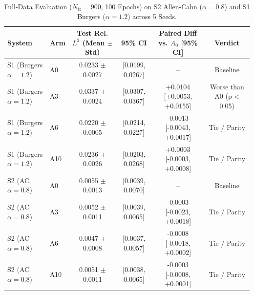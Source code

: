 \begin{table}[t]
\centering
\small
\caption{Full-Data Evaluation ($N_{\text{tr}}=900$, 100 Epochs) on S2 Allen-Cahn ($\alpha=0.8$) and S1 Burgers ($\alpha=1.2$) across 5 Seeds.}
\label{tab:p4_n900}
\begin{tabular}{llcccc}
\toprule
System & Arm & Test Rel. $L^2$ (Mean $\pm$ Std) & 95\% CI & Paired Diff vs. $A_0$ [95\% CI] & Verdict \\
\midrule
S1 (Burgers $\alpha=1.2$) & A0 & 0.0233 $\pm$ 0.0027 & [0.0199, 0.0267] & -- & Baseline \\
S1 (Burgers $\alpha=1.2$) & A3 & 0.0337 $\pm$ 0.0024 & [0.0307, 0.0367] & +0.0104 [+0.0053, +0.0155] & Worse than A0 (p < 0.05) \\
S1 (Burgers $\alpha=1.2$) & A6 & 0.0220 $\pm$ 0.0005 & [0.0214, 0.0227] & -0.0013 [-0.0043, +0.0017] & Tie / Parity \\
S1 (Burgers $\alpha=1.2$) & A10 & 0.0236 $\pm$ 0.0026 & [0.0203, 0.0268] & +0.0003 [-0.0003, +0.0008] & Tie / Parity \\
S2 (AC $\alpha=0.8$) & A0 & 0.0055 $\pm$ 0.0013 & [0.0039, 0.0070] & -- & Baseline \\
S2 (AC $\alpha=0.8$) & A3 & 0.0052 $\pm$ 0.0011 & [0.0039, 0.0065] & -0.0003 [-0.0023, +0.0018] & Tie / Parity \\
S2 (AC $\alpha=0.8$) & A6 & 0.0047 $\pm$ 0.0008 & [0.0037, 0.0057] & -0.0008 [-0.0018, +0.0002] & Tie / Parity \\
S2 (AC $\alpha=0.8$) & A10 & 0.0051 $\pm$ 0.0011 & [0.0038, 0.0065] & -0.0003 [-0.0008, +0.0001] & Tie / Parity \\
\bottomrule
\end{tabular}
\end{table}
